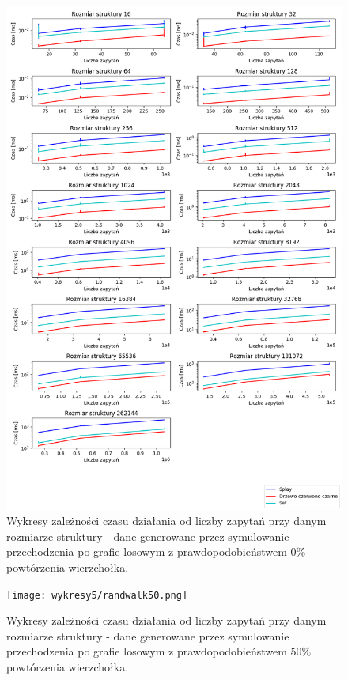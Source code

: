 \documentclass[declaration,shortabstract]{iithesis}
\theoremstyle{thm}
\theoremstyle{remark}
\theoremstyle{plain}
\theoremstyle{plain}
\theoremstyle{plain}
\begin{document}
\begin{figure}[H]  
\centering
    \includegraphics[scale=0.5]{wykresy3/randwalk100.png}
      \caption{Wykresy zależności czasu działania od liczby zapytań przy danym rozmiarze struktury - dane generowane przez symulowanie przechodzenia po grafie losowym z prawdopodobieństwem  \(0\%\) powtórzenia wierzchołka. }  
\end{figure}

\begin{figure}[H]  
\centering
    \texttt{[image: wykresy5/randwalk50.png]}
      \caption{Wykresy zależności czasu działania od liczby zapytań przy danym rozmiarze struktury - dane generowane przez symulowanie przechodzenia po grafie losowym z prawdopodobieństwem  \(50\%\) powtórzenia wierzchołka. }  
\end{figure}
\end{document}
